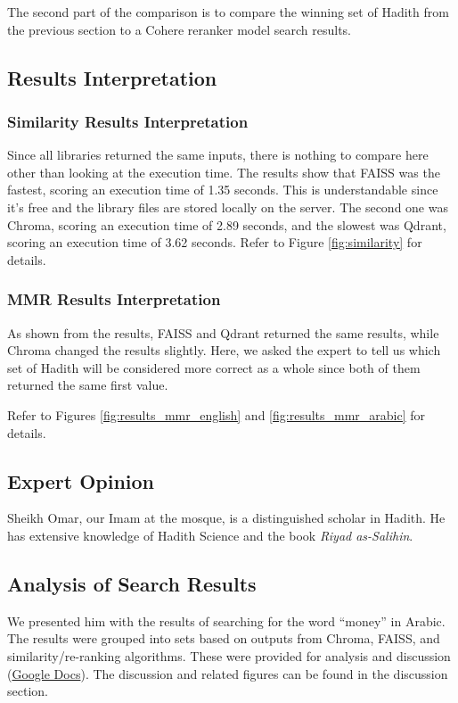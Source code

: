 \documentclass{svproc}
\begin{document}
The second part of the comparison is to compare the winning set of Hadith from the previous section to a Cohere reranker model search results.

\subsection{Results Interpretation}

\subsubsection{Similarity Results Interpretation}

Since all libraries returned the same inputs, there is nothing to compare here other than looking at the execution time. The results show that FAISS was the fastest, scoring an execution time of 1.35 seconds. This is understandable since it’s free and the library files are stored locally on the server. The second one was Chroma, scoring an execution time of 2.89 seconds, and the slowest was Qdrant, scoring an execution time of 3.62 seconds. Refer to Figure \ref{fig:similarity} for details.

\subsubsection{MMR Results Interpretation}

As shown from the results, FAISS and Qdrant returned the same results, while Chroma changed the results slightly. Here, we asked the expert to tell us which set of Hadith will be considered more correct as a whole since both of them returned the same first value.

Refer to Figures \ref{fig:results_mmr_english} and \ref{fig:results_mmr_arabic} for details.

\subsection{Expert Opinion}
Sheikh Omar, our Imam at the mosque, is a distinguished scholar in Hadith. He has extensive knowledge of Hadith Science and the book \textit{Riyad as-Salihin}.

\subsection*{Analysis of Search Results}
We presented him with the results of searching for the word ``money'' in Arabic. The results were grouped into sets based on outputs from Chroma, FAISS, and similarity/re-ranking algorithms. These were provided for analysis and discussion (\href{https://docs.google.com}{Google Docs}). The discussion and related figures can be found in the discussion section.
\end{document}
